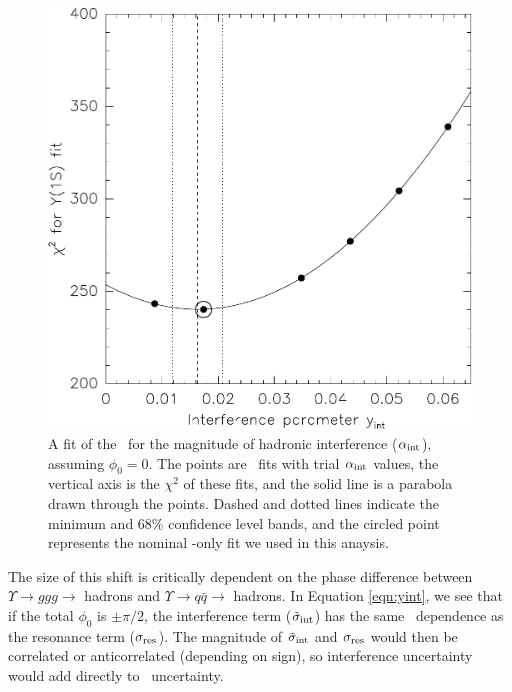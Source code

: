 \documentclass{cornell}
\begin{document}
\begin{figure}[p]
  \begin{center}
    \includegraphics[width=0.8\linewidth]{plots/simpleintfit}
  \end{center}
  \caption{\label{simpleintfit} A fit of the \us\ for the magnitude of
  hadronic interference ($\alpha_{\mbox{\scriptsize int}}$), assuming $\phi_0 = 0$.  The
  points are \us\ fits with trial $\alpha_{\mbox{\scriptsize int}}$ values, the vertical
  axis is the $\chi^2$ of these fits, and the solid line is a parabola
  drawn through the points.  Dashed and dotted lines indicate the
  minimum and 68\% confidence level bands, and the circled point
  represents the nominal \qqbar-only fit we used in this anaysis.}
\end{figure}

The size of this shift is critically dependent on the phase difference
between $\Upsilon \to ggg \to$ hadrons and $\Upsilon \to q\bar{q} \to$
hadrons.  In Equation \ref{eqn:yint}, we see that if the total
$\phi_0$ is $\pm\pi/2$, the interference term ($\tilde{\sigma}_{\mbox{\scriptsize int}}$)
has the same \ecm\ dependence as the resonance term
($\sigma_{\mbox{\scriptsize res}}$).  The magnitude of $\tilde{\sigma}_{\mbox{\scriptsize int}}$ and
$\sigma_{\mbox{\scriptsize res}}$ would then be correlated or anticorrelated
(depending on sign), so interference uncertainty would add directly to
\geehadtot\ uncertainty.
\end{document}
